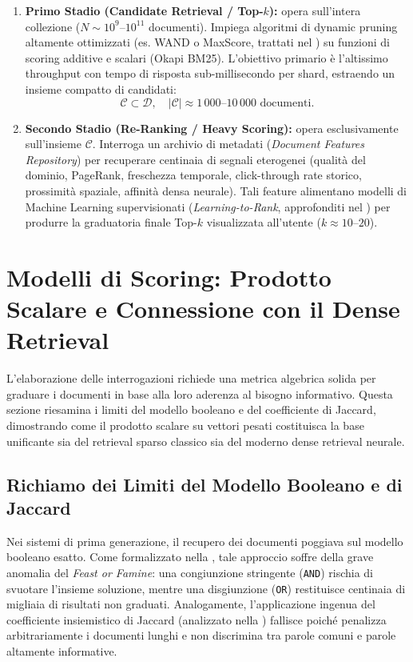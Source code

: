 \begin{enumerate}
    \item \textbf{Primo Stadio (Candidate Retrieval / Top-$k$):} opera sull'intera collezione ($N \sim 10^9\text{--}10^{11}$ documenti). Impiega algoritmi di dynamic pruning altamente ottimizzati (es. WAND o MaxScore, trattati nel ) su funzioni di scoring additive e scalari (Okapi BM25). L'obiettivo primario \`e l'altissimo throughput con tempo di risposta sub-millisecondo per shard, estraendo un insieme compatto di candidati:
    \begin{equation}
    \mathcal{C} \subset \mathcal{D}, \quad |\mathcal{C}| \approx 1\,000 \text{--} 10\,000 \text{ documenti}.
    \end{equation}
    \item \textbf{Secondo Stadio (Re-Ranking / Heavy Scoring):} opera esclusivamente sull'insieme $\mathcal{C}$. Interroga un archivio di metadati (\textit{Document Features Repository}) per recuperare centinaia di segnali eterogenei (qualit\`a del dominio, PageRank, freschezza temporale, click-through rate storico, prossimit\`a spaziale, affinit\`a densa neurale). Tali feature alimentano modelli di Machine Learning supervisionati (\textit{Learning-to-Rank}, approfonditi nel ) per produrre la graduatoria finale Top-$k$ visualizzata all'utente ($k \approx 10\text{--}20$).
\end{enumerate}

\FloatBarrier
\section{Modelli di Scoring: Prodotto Scalare e Connessione con il Dense Retrieval}
\label{sec:scoring-dotproduct-ponte}

L'elaborazione delle interrogazioni richiede una metrica algebrica solida per graduare i documenti in base alla loro aderenza al bisogno informativo. Questa sezione riesamina i limiti del modello booleano e del coefficiente di Jaccard, dimostrando come il prodotto scalare su vettori pesati costituisca la base unificante sia del retrieval sparso classico sia del moderno dense retrieval neurale.

\FloatBarrier
\subsection{Richiamo dei Limiti del Modello Booleano e di Jaccard}
\label{subsec:limiti-booleano-jaccard}
Nei sistemi di prima generazione, il recupero dei documenti poggiava sul modello booleano esatto. Come formalizzato nella , tale approccio soffre della grave anomalia del \textit{Feast or Famine}: una congiunzione stringente (\texttt{AND}) rischia di svuotare l'insieme soluzione, mentre una disgiunzione (\texttt{OR}) restituisce centinaia di migliaia di risultati non graduati. Analogamente, l'applicazione ingenua del coefficiente insiemistico di Jaccard (analizzato nella ) fallisce poich\'e penalizza arbitrariamente i documenti lunghi e non discrimina tra parole comuni e parole altamente informative.

